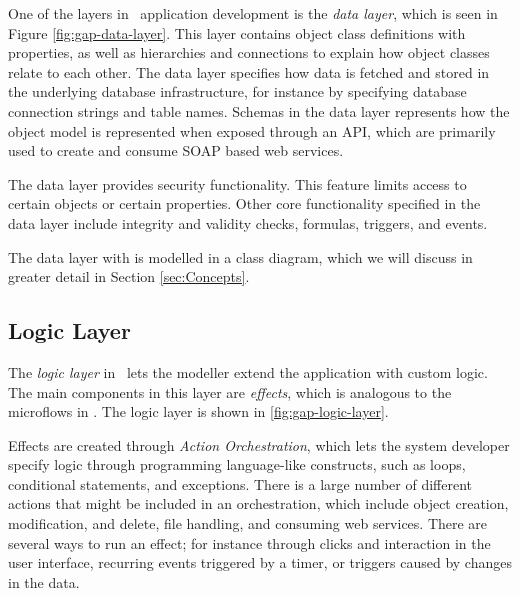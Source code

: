 One of the layers in \gap~application development is the \textit{data layer}, which is seen in Figure \ref{fig:gap-data-layer}. This layer contains object class definitions with properties, as well as hierarchies and connections to explain how object classes relate to each other. The data layer specifies how data is fetched and stored in the underlying database infrastructure, for instance by specifying database connection strings and table names. Schemas in the data layer represents how the object model is represented when exposed through an API, which are primarily used to create and consume SOAP based web services.

The data layer provides security functionality. This feature limits access to certain objects or certain properties. Other core functionality specified in the data layer include integrity and validity checks, formulas, triggers, and events.

The data layer with is modelled in a class diagram, which we will discuss in greater detail in Section \ref{sec:Concepts}.

\subsection{Logic Layer}
\label{sub:Logic Layer}


The \textit{logic layer} in \gap~lets the modeller extend the application with custom logic. The main components in this layer are \textit{effects}, which is analogous to the microflows in \mendix.  The logic layer is shown in \ref{fig:gap-logic-layer}.

Effects are created through \textit{Action Orchestration}, which lets the system developer specify logic through programming language-like constructs, such as loops, conditional statements, and exceptions. There is a large number of different actions that might be included in an orchestration, which include object creation, modification, and delete, file handling, and consuming web services. There are several ways to run an effect; for instance through clicks and interaction in the user interface, recurring events triggered by a timer, or triggers caused by changes in the data.

